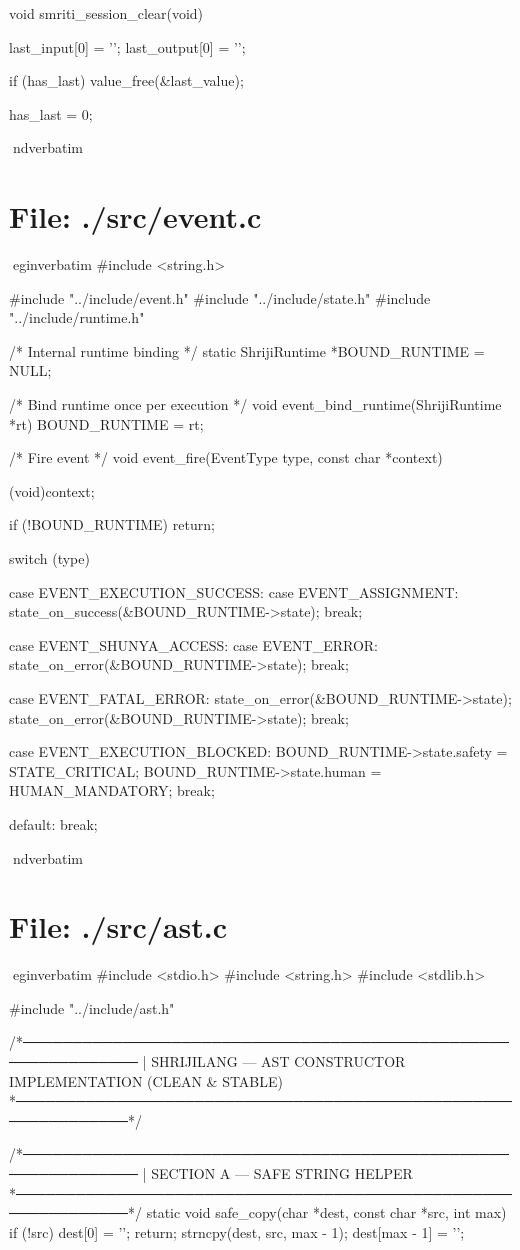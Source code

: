 \documentclass{article}
\begin{document}
void smriti_session_clear(void)
{
    last_input[0] = '\0';
    last_output[0] = '\0';

    if (has_last)
        value_free(&last_value);

    has_last = 0;
}
nd{verbatim}
\section*{File: ./src/event.c}
egin{verbatim}
#include <string.h>

#include "../include/event.h"
#include "../include/state.h"
#include "../include/runtime.h"

/* Internal runtime binding */
static ShrijiRuntime *BOUND_RUNTIME = NULL;

/* Bind runtime once per execution */
void event_bind_runtime(ShrijiRuntime *rt)
{
    BOUND_RUNTIME = rt;
}

/* Fire event */
void event_fire(EventType type, const char *context)
{
    (void)context;

    if (!BOUND_RUNTIME)
        return;

    switch (type)
    {
        case EVENT_EXECUTION_SUCCESS:
        case EVENT_ASSIGNMENT:
            state_on_success(&BOUND_RUNTIME->state);
            break;

        case EVENT_SHUNYA_ACCESS:
        case EVENT_ERROR:
            state_on_error(&BOUND_RUNTIME->state);
            break;

        case EVENT_FATAL_ERROR:
            state_on_error(&BOUND_RUNTIME->state);
            state_on_error(&BOUND_RUNTIME->state);
            break;

        case EVENT_EXECUTION_BLOCKED:
            BOUND_RUNTIME->state.safety = STATE_CRITICAL;
            BOUND_RUNTIME->state.human  = HUMAN_MANDATORY;
            break;

        default:
            break;
    }
}
nd{verbatim}
\section*{File: ./src/ast.c}
egin{verbatim}
#include <stdio.h>
#include <string.h>
#include <stdlib.h>

#include "../include/ast.h"

/*──────────────────────────────────────────────────────────────
 |  SHRIJILANG — AST CONSTRUCTOR IMPLEMENTATION (CLEAN & STABLE)
 *──────────────────────────────────────────────────────────────*/

/*──────────────────────────────────────────────────────────────
 | SECTION A — SAFE STRING HELPER
 *──────────────────────────────────────────────────────────────*/
static void safe_copy(char *dest, const char *src, int max)
{
    if (!src) {
        dest[0] = '\0';
        return;
    }
    strncpy(dest, src, max - 1);
    dest[max - 1] = '\0';
}
\end{document}
